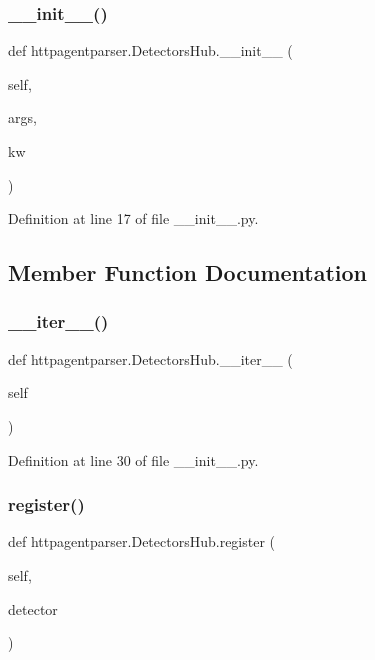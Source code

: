 \subsubsection{\texorpdfstring{\+\_\+\+\_\+init\+\_\+\+\_\+()}{\_\_init\_\_()}}
{\footnotesize\ttfamily def httpagentparser.\+Detectors\+Hub.\+\_\+\+\_\+init\+\_\+\+\_\+ (\begin{DoxyParamCaption}\item[{}]{self,  }\item[{}]{args,  }\item[{}]{kw }\end{DoxyParamCaption})}



Definition at line 17 of file \+\_\+\+\_\+init\+\_\+\+\_\+.\+py.



\subsection{Member Function Documentation}
\hypertarget{classhttpagentparser_1_1_detectors_hub_a4320210b2d22e1a6c47c15ff470ffc94}{}\label{classhttpagentparser_1_1_detectors_hub_a4320210b2d22e1a6c47c15ff470ffc94} 
\subsubsection{\texorpdfstring{\+\_\+\+\_\+iter\+\_\+\+\_\+()}{\_\_iter\_\_()}}
{\footnotesize\ttfamily def httpagentparser.\+Detectors\+Hub.\+\_\+\+\_\+iter\+\_\+\+\_\+ (\begin{DoxyParamCaption}\item[{}]{self }\end{DoxyParamCaption})}



Definition at line 30 of file \+\_\+\+\_\+init\+\_\+\+\_\+.\+py.

\hypertarget{classhttpagentparser_1_1_detectors_hub_aaaec4b81fb2e83563d46c2dfcc43f9ba}{}\label{classhttpagentparser_1_1_detectors_hub_aaaec4b81fb2e83563d46c2dfcc43f9ba} 
\subsubsection{\texorpdfstring{register()}{register()}}
{\footnotesize\ttfamily def httpagentparser.\+Detectors\+Hub.\+register (\begin{DoxyParamCaption}\item[{}]{self,  }\item[{}]{detector }\end{DoxyParamCaption})}




